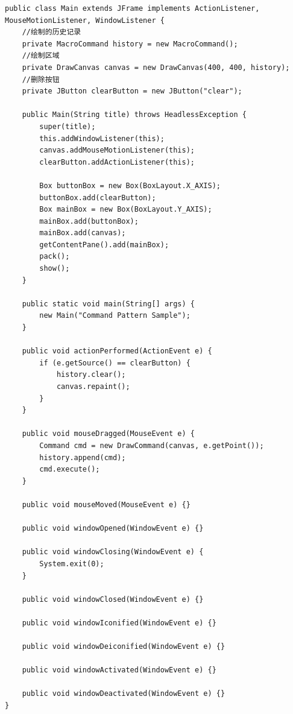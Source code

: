 \begin{lstlisting}
public class Main extends JFrame implements ActionListener, MouseMotionListener, WindowListener {
	//绘制的历史记录
	private MacroCommand history = new MacroCommand();
	//绘制区域
	private DrawCanvas canvas = new DrawCanvas(400, 400, history);
	//删除按钮
	private JButton clearButton = new JButton("clear");
	
	public Main(String title) throws HeadlessException {
		super(title);
		this.addWindowListener(this);
		canvas.addMouseMotionListener(this);
		clearButton.addActionListener(this);
		
		Box buttonBox = new Box(BoxLayout.X_AXIS);
		buttonBox.add(clearButton);
		Box mainBox = new Box(BoxLayout.Y_AXIS);
		mainBox.add(buttonBox);
		mainBox.add(canvas);
		getContentPane().add(mainBox);
		pack();
		show();
	}
	
	public static void main(String[] args) {
		new Main("Command Pattern Sample");
	}
	
	public void actionPerformed(ActionEvent e) {
		if (e.getSource() == clearButton) {
			history.clear();
			canvas.repaint();
		}
	}
	
	public void mouseDragged(MouseEvent e) {
		Command cmd = new DrawCommand(canvas, e.getPoint());
		history.append(cmd);
		cmd.execute();
	}
	
	public void mouseMoved(MouseEvent e) {}
	
	public void windowOpened(WindowEvent e) {}
	
	public void windowClosing(WindowEvent e) {
		System.exit(0);
	}
	
	public void windowClosed(WindowEvent e) {}
	
	public void windowIconified(WindowEvent e) {}
	
	public void windowDeiconified(WindowEvent e) {}
	
	public void windowActivated(WindowEvent e) {}
	
	public void windowDeactivated(WindowEvent e) {}
}
\end{lstlisting}
